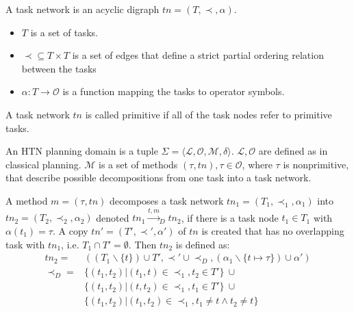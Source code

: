 \begin{definition}
  A task network is an acyclic digraph $tn = (T,\prec,\alpha)$.
  \begin{itemize}
    \item $T$ is a set of tasks.
    \item $\prec \subseteq T \times T$ is a set of edges that define a strict partial ordering relation between the tasks
    \item $\alpha: T \rightarrow \mathcal{O}$ is a function mapping the tasks to operator symbols.
  \end{itemize}
\end{definition}

A task network $tn$ is called primitive if all of the task nodes refer to primitive tasks. 

\begin{definition}
  An HTN planning domain is a tuple $\Sigma=\langle \mathcal{L}, \mathcal{O}, \mathcal{M}, \delta \rangle$.
  $\mathcal{L},\mathcal{O}$ are defined as in classical planning. 
  $\mathcal{M}$ is a set of methods $(\tau,tn), \tau \in \mathcal{O}$, where $\tau$ is nonprimitive, that describe possible decompositions from one task into a task network.
\end{definition}


\begin{definition}
  A method $m = (\tau,tn)$ decomposes a task network $tn_1 = (T_1,\prec_1,\alpha_1)$ into $tn_2 = (T_2,\prec_2,\alpha_2)$ denoted $tn_1 \xrightarrow{t,m}_D tn_2$, if there is a task node $t_1 \in T_1$ with $\alpha(t_1) = \tau$.
  A copy $tn' = (T',\prec',\alpha')$ of $tn$ is created that has no overlapping task with $tn_1$, i.e. $T_1 \cap T' = \emptyset$.
  Then $tn_2$ is defined as:
  \begin{align*}
    tn_2 = & ((T_1 \backslash  \{t\}) \cup T', \prec' \cup \prec_D, (\alpha_1 \backslash \{t \mapsto \tau\}) \cup \alpha') \\
    \prec_D = & \{(t_1, t_2) | (t_1, t) \in \prec_1, t_2 \in T'\}~ \cup \\
    & \{(t_1, t_2) | (t, t_2) \in \prec_1, t_1 \in T '\}~ \cup \\
    & \{(t_1, t_2) | (t_1, t_2) \in \prec_1, t_1 \neq t \land t_2 \neq t\}\\
  \end{align*}
  \label{def:htn-task-dec}
\end{definition}


